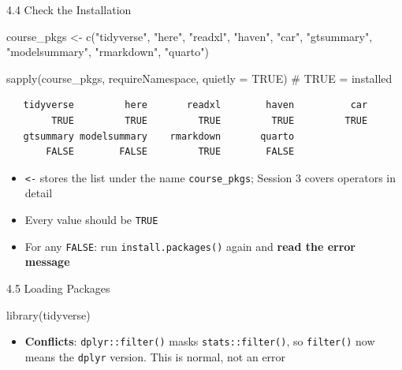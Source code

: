 \documentclass[
  ignorenonframetext,
  aspectratio=169,
]{beamer}
\newenvironment{Shaded}{\begin{snugshade}}{\end{snugshade}}
\newcommand{\AttributeTok}[1]{\textcolor[rgb]{0.40,0.45,0.13}{#1}}
\newcommand{\CommentTok}[1]{\textcolor[rgb]{0.37,0.37,0.37}{#1}}
\newcommand{\ConstantTok}[1]{\textcolor[rgb]{0.56,0.35,0.01}{#1}}
\newcommand{\FunctionTok}[1]{\textcolor[rgb]{0.28,0.35,0.67}{#1}}
\newcommand{\NormalTok}[1]{\textcolor[rgb]{0.00,0.23,0.31}{#1}}
\newcommand{\OtherTok}[1]{\textcolor[rgb]{0.00,0.23,0.31}{#1}}
\newcommand{\StringTok}[1]{\textcolor[rgb]{0.13,0.47,0.30}{#1}}
\providecommand{\tightlist}{%
  \setlength{\itemsep}{0pt}\setlength{\parskip}{0pt}}
\begin{document}
\begin{frame}[fragile]{4.4 Check the Installation}
\protect{}\label{check-the-installation}
\begin{Shaded}
\begin{Highlighting}[]
\NormalTok{course\_pkgs }\OtherTok{\textless{}{-}} \FunctionTok{c}\NormalTok{(}\StringTok{"tidyverse"}\NormalTok{, }\StringTok{"here"}\NormalTok{, }\StringTok{"readxl"}\NormalTok{, }\StringTok{"haven"}\NormalTok{, }\StringTok{"car"}\NormalTok{,}
                 \StringTok{"gtsummary"}\NormalTok{, }\StringTok{"modelsummary"}\NormalTok{, }\StringTok{"rmarkdown"}\NormalTok{, }\StringTok{"quarto"}\NormalTok{)}

\FunctionTok{sapply}\NormalTok{(course\_pkgs, requireNamespace, }\AttributeTok{quietly =} \ConstantTok{TRUE}\NormalTok{)   }\CommentTok{\# TRUE = installed}
\end{Highlighting}
\end{Shaded}

\begingroup\tiny\color{darkgray}

\begin{verbatim}
   tidyverse         here       readxl        haven          car 
        TRUE         TRUE         TRUE         TRUE         TRUE 
   gtsummary modelsummary    rmarkdown       quarto 
       FALSE        FALSE         TRUE        FALSE 
\end{verbatim}

\endgroup

\begin{itemize}
\item
  \texttt{\textless{}-} stores the list under the name
  \texttt{course\_pkgs}; Session 3 covers operators in detail
\item
  Every value should be \texttt{TRUE}
\item
  For any \texttt{FALSE}: run \texttt{install.packages()} again and
  \textbf{read the error message}
\end{itemize}
\end{frame}

\begin{frame}[fragile]{4.5 Loading Packages}
\protect{}\label{loading-packages}
\begin{Shaded}
\begin{Highlighting}[]
\FunctionTok{library}\NormalTok{(tidyverse)}
\end{Highlighting}
\end{Shaded}

\begin{itemize}
\tightlist
\item
  \textbf{Conflicts}: \texttt{dplyr::filter()} masks
  \texttt{stats::filter()}, so \texttt{filter()} now means the
  \texttt{dplyr} version. This is normal, not an error
\end{itemize}
\end{frame}
\end{document}
